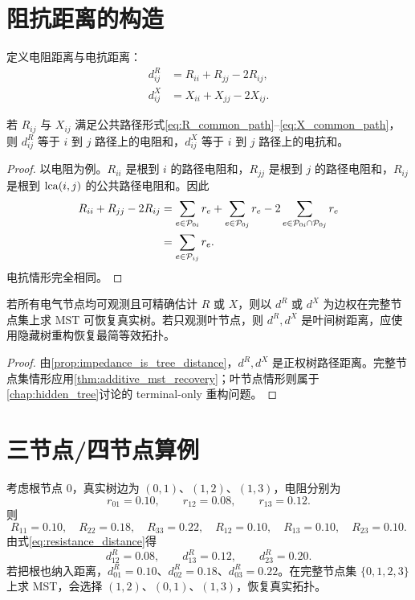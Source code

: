 \section{阻抗距离的构造}

定义电阻距离与电抗距离：
\begin{align}
  d^R_{ij} &= R_{ii}+R_{jj}-2R_{ij}, \label{eq:resistance_distance}\\
  d^X_{ij} &= X_{ii}+X_{jj}-2X_{ij}. \label{eq:reactance_distance}
\end{align}

\begin{proposition}[阻抗距离是树上路径距离]
\label{prop:impedance_is_tree_distance}
若 $R_{ij}$ 与 $X_{ij}$ 满足公共路径形式\eqref{eq:R_common_path}--\eqref{eq:X_common_path}，则 $d^R_{ij}$ 等于 $i$ 到 $j$ 路径上的电阻和，$d^X_{ij}$ 等于 $i$ 到 $j$ 路径上的电抗和。
\end{proposition}

\begin{proof}
以电阻为例。$R_{ii}$ 是根到 $i$ 的路径电阻和，$R_{jj}$ 是根到 $j$ 的路径电阻和，$R_{ij}$ 是根到 $\operatorname{lca}(i,j)$ 的公共路径电阻和。因此
\begin{align}
  R_{ii}+R_{jj}-2R_{ij}
  &=
  \sum_{e\in \mathcal{P}_{0i}}r_e+
  \sum_{e\in \mathcal{P}_{0j}}r_e-
  2\sum_{e\in \mathcal{P}_{0i}\cap \mathcal{P}_{0j}}r_e\\
  &=
  \sum_{e\in \mathcal{P}_{ij}}r_e .
\end{align}
电抗情形完全相同。
\end{proof}

\begin{corollary}
\label{cor:impedance_mst_hidden}
若所有电气节点均可观测且可精确估计 $R$ 或 $X$，则以 $d^R$ 或 $d^X$ 为边权在完整节点集上求 MST 可恢复真实树。若只观测叶节点，则 $d^R,d^X$ 是叶间树距离，应使用隐藏树重构恢复最简等效拓扑。
\end{corollary}

\begin{proof}
由\cref{prop:impedance_is_tree_distance}，$d^R,d^X$ 是正权树路径距离。完整节点集情形应用\cref{thm:additive_mst_recovery}；叶节点情形则属于\cref{chap:hidden_tree}讨论的 terminal-only 重构问题。
\end{proof}

\section{三节点/四节点算例}

\begin{example}[四节点径向网的电阻距离]
考虑根节点 $0$，真实树边为 $(0,1)$、$(1,2)$、$(1,3)$，电阻分别为
\[
  r_{01}=0.10,\qquad r_{12}=0.08,\qquad r_{13}=0.12 .
\]
则
\[
R_{11}=0.10,\quad R_{22}=0.18,\quad R_{33}=0.22,\quad
R_{12}=0.10,\quad R_{13}=0.10,\quad R_{23}=0.10.
\]
由式\eqref{eq:resistance_distance}得
\[
d^R_{12}=0.08,\qquad d^R_{13}=0.12,\qquad d^R_{23}=0.20.
\]
若把根也纳入距离，$d^R_{01}=0.10$、$d^R_{02}=0.18$、$d^R_{03}=0.22$。在完整节点集 $\{0,1,2,3\}$ 上求 MST，会选择 $(1,2)$、$(0,1)$、$(1,3)$，恢复真实拓扑。
\end{example}


